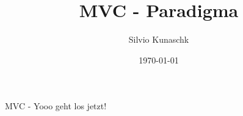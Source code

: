 \documentclass[11pt,a4paper]{scrreprt}
\begin{document}
\selectlanguage{\german}
\title{MVC - Paradigma}
\author{Silvio Kunaschk}
\date{\today}
\maketitle
\tableofcontents

MVC - Yooo geht los jetzt!

\pagediagram
\end{document}
